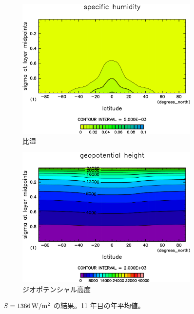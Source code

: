 \documentclass[body]{subfiles}
\begin{document}
\begin{figure}[t]
\begin{subfigure}{.4\textwidth}
		\includegraphics[width=\columnwidth]{S1366/QH2OVap,time=14600:14965-crop-rotate.pdf}
		\caption{比湿}\label{S1366比湿}
	\end{subfigure}
	\begin{subfigure}{.4\textwidth}
		\centering
		\includegraphics[width=\columnwidth]{S1366/Height,time=14600:14965-crop-rotate.pdf}
		\caption{ジオポテンシャル高度}\label{S1366ジオポテンシャル高度}
	\end{subfigure}
	\caption{
		\(S=1366\hmu{W/m^2}\) の結果。11 年目の年平均値。
	}\label{S1366}
\end{figure}
\end{document}
